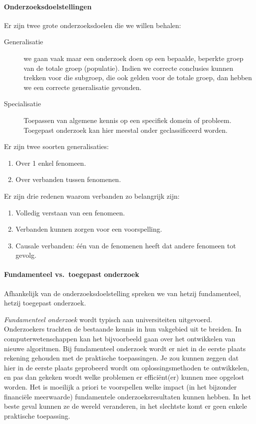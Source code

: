 \paragraph{Onderzoeksdoelstellingen}

Er zijn twee grote onderzoeksdoelen die we willen behalen:

\begin{description}
  \item [Generalisatie] we gaan vaak maar een onderzoek doen op een bepaalde, beperkte groep van de totale groep (populatie). Indien we correcte conclusies kunnen trekken voor die subgroep, die ook gelden voor de totale groep, dan hebben we een correcte generalisatie gevonden.
  \item[Specialisatie] Toepassen van algemene kennis op een specifiek domein of probleem. Toegepast onderzoek kan hier meestal onder geclassificeerd worden.
\end{description}

Er zijn twee soorten generalisaties:
\begin{enumerate}
  \item Over 1 enkel fenomeen.
  \item Over verbanden tussen fenomenen.
\end{enumerate}
Er zijn drie redenen waarom verbanden zo belangrijk zijn:
\begin{enumerate}
  \item Volledig verstaan van een fenomeen. 
  \item Verbanden kunnen zorgen voor een voorspelling.
  \item Causale verbanden: één van de fenomenen heeft dat andere fenomeen tot gevolg. 
\end{enumerate}

\paragraph{Fundamenteel vs.~toegepast onderzoek}

Afhankelijk van de onderzoeksdoelstelling spreken we van hetzij fundamenteel, hetzij toegepast onderzoek.

\emph{Fundamenteel onderzoek} wordt typisch aan universiteiten uitgevoerd. Onderzoekers trachten de bestaande kennis in hun vakgebied uit te breiden. In computerwetenschappen kan het bijvoorbeeld gaan over het ontwikkelen van nieuwe algoritmen. Bij fundamenteel onderzoek wordt er niet in de eerste plaats rekening gehouden met de praktische toepassingen. Je zou kunnen zeggen dat hier in de eerste plaats geprobeerd wordt om oplossingsmethoden te ontwikkelen, en pas dan gekeken wordt welke problemen er effici\"ent(er) kunnen mee opgelost worden. Het is moeilijk a priori te voorspellen welke impact (in het bijzonder financi\"ele meerwaarde) fundamentele onderzoeksresultaten kunnen hebben. In het beste geval kunnen ze de wereld veranderen, in het slechtste komt er geen enkele praktische toepassing.

